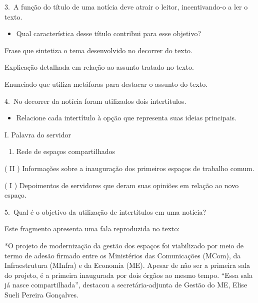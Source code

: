 \begin{itemize}


3.~A função do título de uma notícia deve atrair o leitor,
incentivando-o a ler o texto.

\begin{itemize}
\tightlist
\item
  Qual característica desse título contribui para esse objetivo?
\end{itemize}

 Frase que sintetiza o tema desenvolvido no decorrer do texto.

 Explicação detalhada em relação ao assunto tratado no texto.

 Enunciado que utiliza metáforas para destacar o assunto do texto.

4.~No decorrer da notícia foram utilizados dois intertítulos.

\begin{itemize}
\tightlist
\item
  Relacione cada intertítulo à opção que representa suas ideias
  principais.
\end{itemize}

I. Palavra do servidor

\begin{enumerate}
\def\labelenumi{\Roman{enumi}.}
\setcounter{enumi}{1}
\tightlist
\item
  Rede de espaços compartilhados
\end{enumerate}

( II ) Informações sobre a inauguração dos primeiros espaços de trabalho
comum.

( I ) Depoimentos de servidores que deram suas opiniões em relação ao
novo espaço.

5.~Qual é o objetivo da utilização de intertítulos em uma notícia?



Este fragmento apresenta uma fala reproduzida no texto:

*O projeto de modernização da gestão dos espaços foi viabilizado por
meio de termo de adesão firmado entre os Ministérios das Comunicações
(MCom), da Infraestrutura (MInfra) e da Economia (ME). Apesar de não ser
a primeira sala do projeto, é a primeira inaugurada por dois órgãos ao
mesmo tempo. ``Essa sala já nasce compartilhada'', destacou a
secretária-adjunta de Gestão do ME, Elise Sueli Pereira Gonçalves.


\end{itemize}
